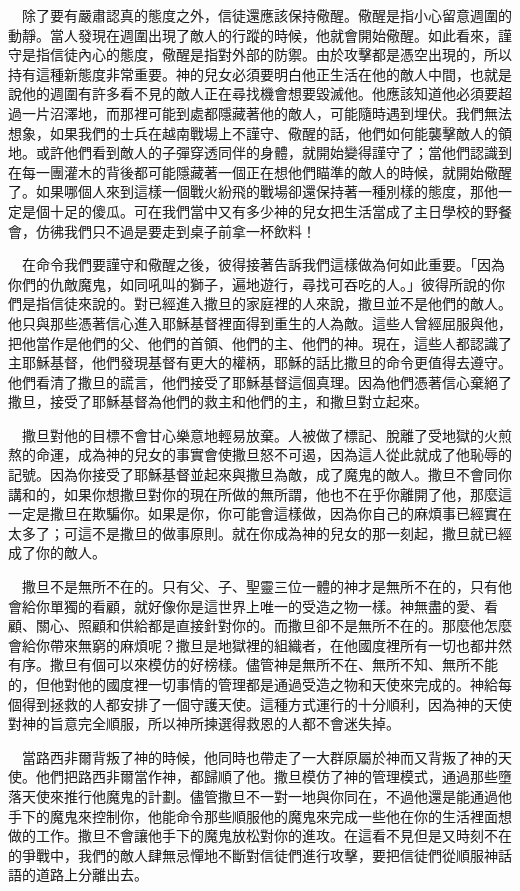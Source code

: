 \documentclass{book}
\begin{document}
　除了要有嚴肅認真的態度之外，信徒還應該保持儆醒。儆醒是指小心留意週圍的動靜。當人發現在週圍出現了敵人的行蹤的時候，他就會開始儆醒。如此看來，謹守是指信徒內心的態度，儆醒是指對外部的防禦。由於攻擊都是憑空出現的，所以持有這種新態度非常重要。神的兒女必須要明白他正生活在他的敵人中間，也就是說他的週圍有許多看不見的敵人正在尋找機會想要毀滅他。他應該知道他必須要超過一片沼澤地，而那裡可能到處都隱藏著他的敵人，可能隨時遇到埋伏。我們無法想象，如果我們的士兵在越南戰場上不謹守、儆醒的話，他們如何能襲擊敵人的領地。或許他們看到敵人的子彈穿透同伴的身體，就開始變得謹守了；當他們認識到在每一團灌木的背後都可能隱藏著一個正在想他們瞄準的敵人的時候，就開始儆醒了。如果哪個人來到這樣一個戰火紛飛的戰場卻還保持著一種別樣的態度，那他一定是個十足的傻瓜。可在我們當中又有多少神的兒女把生活當成了主日學校的野餐會，仿彿我們只不過是要走到桌子前拿一杯飲料！

　在命令我們要謹守和儆醒之後，彼得接著告訴我們這樣做為何如此重要。「因為你們的仇敵魔鬼，如同吼叫的獅子，遍地遊行，尋找可吞吃的人。」彼得所說的你們是指信徒來說的。對已經進入撒旦的家庭裡的人來說，撒旦並不是他們的敵人。他只與那些憑著信心進入耶穌基督裡面得到重生的人為敵。這些人曾經屈服與他，把他當作是他們的父、他們的首領、他們的主、他們的神。現在，這些人都認識了主耶穌基督，他們發現基督有更大的權柄，耶穌的話比撒旦的命令更值得去遵守。他們看清了撒旦的謊言，他們接受了耶穌基督這個真理。因為他們憑著信心棄絕了撒旦，接受了耶穌基督為他們的救主和他們的主，和撒旦對立起來。

　撒旦對他的目標不會甘心樂意地輕易放棄。人被做了標記、脫離了受地獄的火煎熬的命運，成為神的兒女的事實會使撒旦怒不可遏，因為這人從此就成了他恥辱的記號。因為你接受了耶穌基督並起來與撒旦為敵，成了魔鬼的敵人。撒旦不會同你講和的，如果你想撒旦對你的現在所做的無所謂，他也不在乎你離開了他，那麼這一定是撒旦在欺騙你。如果是你，你可能會這樣做，因為你自己的麻煩事已經實在太多了；可這不是撒旦的做事原則。就在你成為神的兒女的那一刻起，撒旦就已經成了你的敵人。

　撒旦不是無所不在的。只有父、子、聖靈三位一體的神才是無所不在的，只有他會給你單獨的看顧，就好像你是這世界上唯一的受造之物一樣。神無盡的愛、看顧、關心、照顧和供給都是直接針對你的。而撒旦卻不是無所不在的。那麼他怎麼會給你帶來無窮的麻煩呢？撒旦是地獄裡的組織者，在他國度裡所有一切也都井然有序。撒旦有個可以來模仿的好榜樣。儘管神是無所不在、無所不知、無所不能的，但他對他的國度裡一切事情的管理都是通過受造之物和天使來完成的。神給每個得到拯救的人都安排了一個守護天使。這種方式運行的十分順利，因為神的天使對神的旨意完全順服，所以神所揀選得救恩的人都不會迷失掉。

　當路西非爾背叛了神的時候，他同時也帶走了一大群原屬於神而又背叛了神的天使。他們把路西非爾當作神，都歸順了他。撒旦模仿了神的管理模式，通過那些墮落天使來推行他魔鬼的計劃。儘管撒旦不一對一地與你同在，不過他還是能通過他手下的魔鬼來控制你，他能命令那些順服他的魔鬼來完成一些他在你的生活裡面想做的工作。撒旦不會讓他手下的魔鬼放松對你的進攻。在這看不見但是又時刻不在的爭戰中，我們的敵人肆無忌憚地不斷對信徒們進行攻擊，要把信徒們從順服神話語的道路上分離出去。
\end{document}
